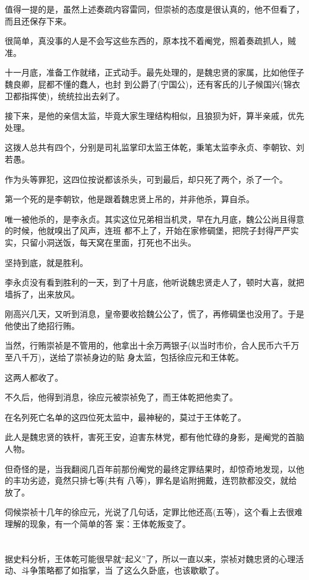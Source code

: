 \documentclass[11pt,a4paper,onecolumn]{article}
\begin{document}
值得一提的是，虽然上述奏疏内容雷同，但崇祯的态度是很认真的，他不但看了，而且还保存下来。

很简单，真没事的人是不会写这些东西的，原本找不着阉党，照着奏疏抓人，贼准。

十一月底，准备工作就绪，正式动手。最先处理的，是魏忠贤的家属，比如他侄子魏良卿，屁都不懂的蠢人，也封
到公爵了(宁国公)，还有客氏的儿子候国兴(锦衣卫都指挥使)，统统拉出去剁了。

接下来，是他的亲信太监，毕竟大家生理结构相似，且狼狈为奸，算半亲戚，优先处理。

这拨人总共有四个，分别是司礼监掌印太监王体乾，秉笔太监李永贞、李朝钦、刘若愚。

作为头等罪犯，这四位按说都该杀头，可到最后，却只死了两个，杀了一个。

第一个死的是李朝钦，他是跟着魏忠贤上吊的，并非他杀，算自杀。

唯一被他杀的，是李永贞。其实这位兄弟相当机灵，早在九月底，魏公公尚且得意的时候，他就嗅出了风声，连班
都不上了，开始在家修碉堡，把院子封得严严实实，只留小洞送饭，每天窝在里面，打死也不出头。

坚持到底，就是胜利。

李永贞没有看到胜利的一天，到了十月底，他听说魏忠贤走人了，顿时大喜，就把墙拆了，出来放风。

刚高兴几天，又听到消息，皇帝要收拾魏公公了，慌了，再修碉堡也没用了。于是他使出了绝招\myrule 行贿。

当然，行贿崇祯是不管用的，他拿出十余万两银子(以当时市价，合人民币六千万至八千万)，送给了崇祯身边的贴
身太监，包括徐应元和王体乾。

这两人都收了。

不久后，他得到消息，徐应元被崇祯免了，而王体乾把他卖了。

在名列死亡名单的这四位死太监中，最神秘的，莫过于王体乾了。

此人是魏忠贤的铁杆，害死王安，迫害东林党，都有他忙碌的身影，是阉党的首脑人物。

但奇怪的是，当我翻阅几百年前那份阉党的最终定罪结果时，却惊奇地发现，以他的丰功劣迹，竟然只排七等(共有
八等)，罪名是谄附拥戴，连罚款都没交，就给放了。

伺候崇祯十几年的徐应元，光说了几句话，定罪比他还高(五等)，这个看上去很难理解的现象，有一个简单的答
案：王体乾叛变了。

\section[\thesection]{}

据史料分析，王体乾可能很早就``起义''了，所以一直以来，崇祯对魏忠贤的心理活动、斗争策略都了如指掌，当
了这么久卧底，也该歇歇了。
\end{document}
